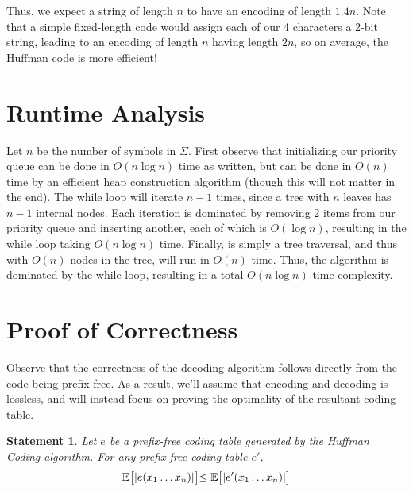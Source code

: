 \documentclass[10pt, twocolumn]{article}
\DeclarePairedDelimiter\length{\lvert}{\rvert}
\newtheorem*{statement}{Statement}
\theoremstyle{prob}
\theoremstyle{definition}
\begin{document}
Thus, we expect a string of length $n$ to have an encoding of length $1.4n$. Note that a simple fixed-length code would assign each of our 4 characters a 2-bit string, leading to an encoding of length $n$ having length $2n$, so on average, the Huffman code is more efficient!

\section{Runtime Analysis}

Let $n$ be the number of symbols in $\Sigma$. First observe that initializing our priority queue can be done in $O(n\log n)$ time as written, but can be done in $O(n)$ time by an efficient heap construction algorithm (though this will not matter in the end). The while loop will iterate $n-1$ times, since a tree with $n$ leaves has $n-1$ internal nodes. Each iteration is dominated by removing 2 items from our priority queue and inserting another, each of which is $O(\log n)$, resulting in the while loop taking $O(n\log n)$ time. Finally,  is simply a tree traversal, and thus with $O(n)$ nodes in the tree, will run in $O(n)$ time. Thus, the algorithm is dominated by the while loop, resulting in a total $O(n\log n)$ time complexity.

\section{Proof of Correctness}
Observe that the correctness of the decoding algorithm follows directly from the code being prefix-free. As a result, we'll assume that encoding and decoding is lossless, and will instead focus on proving the optimality of the resultant coding table.

\begin{statement}
    Let $e$ be a prefix-free coding table generated by the Huffman Coding algorithm. For any prefix-free coding table $e'$, 
    \begin{align*} \mathbb{E} \bigr[ \length{e(x_1\dots x_n)} \bigl] \leq \mathbb{E} \bigr[ \length{e'(x_1\dots x_n)} \bigl]
    \end{align*}
\end{statement}
\end{document}
